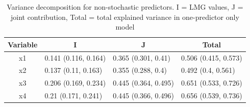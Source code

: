 \documentclass[11pt,a4paper,twoside]{book}
\begin{document}
\begin{table}[h]
\caption{Variance decomposition for non-stochastic predictors. I = LMG values, J = joint contribution, Total = total explained variance in one-predictor only model}
\centering
\begin{tabular}{clll}
  \toprule
  \multicolumn{1}{c}{\textbf{Variable}} & \multicolumn{1}{c}{\textbf{I}} &\multicolumn{1}{c}{\textbf{J}} & \multicolumn{1}{c}{\textbf{Total}} \\
  \hline
x1 & 0.141 (0.116, 0.164)  & 0.365 (0.301, 0.41)   & 0.506 (0.415, 0.573)  \\ 
x2 & 0.137 (0.11, 0.163)  & 0.355 (0.288, 0.4)   & 0.492 (0.4, 0.561)  \\ 
x3 & 0.206 (0.169, 0.234)  & 0.445 (0.364, 0.495)   & 0.651 (0.533, 0.726)  \\ 
x4 & 0.21 (0.171, 0.241)  & 0.445 (0.366, 0.496)   & 0.656 (0.539, 0.736)  \\ 
   \bottomrule
\end{tabular}
\label{tbl:repeated.unstructured}
\end{table}



 

\end{document}
